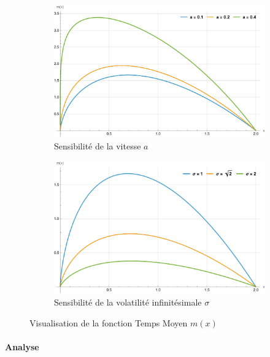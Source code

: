 \begin{figure}[htb]
    \centering
    \begin{subfigure}{0.49\linewidth}
        \includegraphics[width=\linewidth]{img/validation/Mean/mean_a.pdf}
        \caption{Sensibilité de la vitesse $a$}\label{fig:Mean_a_visualisation}
    \end{subfigure}
    \hfill
    \begin{subfigure}{0.49\linewidth}
        \includegraphics[width=\linewidth]{img/validation/Mean/mean_sigma.pdf}
        \caption{Sensibilité de la volatilité infinitésimale $\sigma$}\label{fig:Mean_sigma_visualisation}
    \end{subfigure}
    \caption{Visualisation de la fonction Temps Moyen $m(x)$}\label{fig:MeanVisualisation}
\end{figure}
\FloatBarrier\paragraph{Analyse}\phantom{}\\

